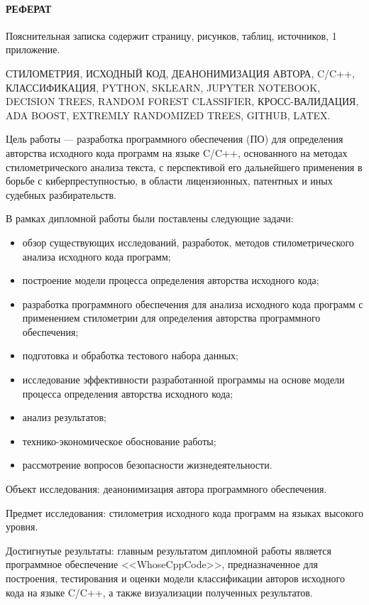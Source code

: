 
\newpage
{}
\paragraph{\hfill РЕФЕРАТ \hfill}
Пояснительная записка содержит  страницу,  рисунков,  таблиц,  источников,
1 приложение.


СТИЛОМЕТРИЯ, ИСХОДНЫЙ КОД, ДЕАНОНИМИЗАЦИЯ АВТОРА, C/C++, КЛАССИФИКАЦИЯ, PYTHON, SKLEARN, JUPYTER NOTEBOOK, DECISION
TREES, RANDOM FOREST CLASSIFIER, КРОСС-ВАЛИДАЦИЯ, ADA BOOST, EXTREMLY RANDOMIZED TREES, GITHUB, LATEX.

Цель работы --- разработка программного обеспечения (ПО) для определения авторства исходного кода программ
на языке C/C++, основанного на методах стилометрического анализа текста, с перспективой его
дальнейшего применения в борьбе с киберпреступностью, в области лицензионных, патентных и иных судебных разбирательств.

В рамках дипломной работы были поставлены следующие задачи: 
\begin{itemize}
  \item обзор существующих исследований, разработок, методов стилометрического анализа исходного кода программ;
\item построение модели процесса определения авторства исходного кода;
  \item разработка программного обеспечения для анализа исходного кода программ с применением стилометрии для
определения авторства программного обеспечения;
  \item подготовка и обработка тестового набора данных;
  \item исследование эффективности разработанной программы на основе модели процесса определения авторства исходного кода;
  \item анализ результатов;
  \item технико-экономическое обоснование работы;
  \item рассмотрение вопросов безопасности жизнедеятельности.
\end{itemize}

Объект исследования: деанонимизация автора программного обеспечения. 

Предмет исследования: стилометрия исходного кода программ на языках высокого уровня.

Достигнутые результаты: главным результатом дипломной работы является 
программное обеспечение <<WhoseCppCode>>, предназначенное для построения,
тестирования и оценки модели классификации авторов исходного кода на языке C/C++,
а также визуализации полученных результатов.

